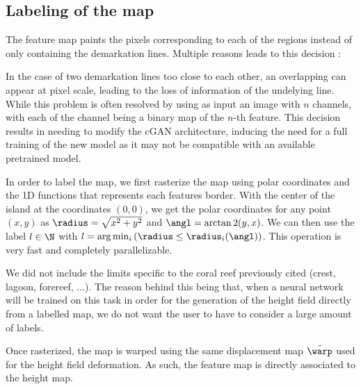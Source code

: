 \subsection{Labeling of the map}
The feature map paints the pixels corresponding to each of the regions instead of only containing the demarkation lines. Multiple reasons leads to this decision :
\begin{Itemize}
    \Item{} In the case of two demarkation lines too close to each other, an overlapping can appear at pixel scale, leading to the loss of information of the undelying line.
    \Item{} While this problem is often resolved by using as input an image with $n$ channels, with each of the channel being a binary map of the $n$-th feature. This decision results in needing to modify the cGAN architecture, inducing the need for a full training of the new model as it may not be compatible with an available pretrained model.
\end{Itemize}

In order to label the map, we first rasterize the map using polar coordinates and the 1D functions that represents each features border. 
With the center of the island at the coordinates $(0, 0)$, we get the polar coordinates for any point $(x, y)$ as $\radius = \sqrt{x^2 + y^2}$ and $\angl = \arctan2 (y, x)$. We can then use the label $l \in \N$ with $l = \arg \min_i \left( \radius \leq \radius_{i}(\angl) \right)$. This operation is very fast and completely parallelizable.

We did not include the limits specific to the coral reef previously cited (crest, lagoon, forereef, ...). The reason behind this being that, when a neural network will be trained on this task in order for the generation of the height field directly from a labelled map, we do not want the user to have to consider a large amount of labels.

Once rasterized, the map is warped using the same displacement map $\Tilde{\warp}$ used for the height field deformation. As such, the feature map is directly associated to the height map.


